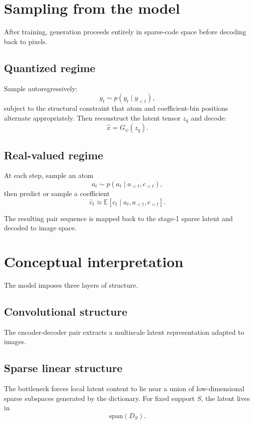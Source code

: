 \documentclass[11pt]{article}
\begin{document}
\section{Sampling from the model}

After training, generation proceeds entirely in sparse-code space before decoding back to pixels.

\subsection{Quantized regime}

Sample autoregressively:
\[
y_t \sim p(y_t \mid y_{<t}),
\]
subject to the structural constraint that atom and coefficient-bin positions alternate appropriately. Then reconstruct the latent tensor $z_q$ and decode:
\[
\hat x = G_\psi(z_q).
\]

\subsection{Real-valued regime}

At each step, sample an atom
\[
a_t \sim p(a_t \mid a_{<t}, c_{<t}),
\]
then predict or sample a coefficient
\[
\hat c_t \approx \mathbb{E}[c_t \mid a_t, a_{<t}, c_{<t}].
\]

The resulting pair sequence is mapped back to the stage-1 sparse latent and decoded to image space.

\section{Conceptual interpretation}

The model imposes three layers of structure.

\subsection{Convolutional structure}

The encoder-decoder pair extracts a multiscale latent representation adapted to images.

\subsection{Sparse linear structure}

The bottleneck forces local latent content to lie near a union of low-dimensional sparse subspaces generated by the dictionary. For fixed support $S$, the latent lives in
\[
\mathrm{span}(D_S).
\]
\end{document}
